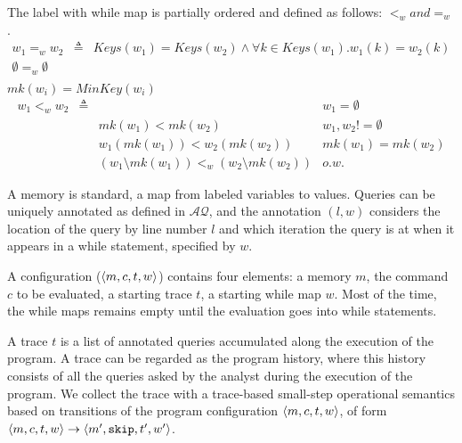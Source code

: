 \documentclass[a4paper,11pt]{article}
\begin{document}
\begin{defn}
The label with while map is partially ordered and defined as follows:
$<_w and =_w$.\\
\[
  \begin{array}{lll}
     w_1 =_w w_2  &  \triangleq &  Keys(w_1) = Keys(w_2) \land \forall k \in Keys(w_1). w_1(k) = w_2(k) \\
     \emptyset =_w \emptyset & &   \\
  \end{array}
\] 
$mk(w_i) =MinKey(w_i) $ 
\[
\begin{array}{llll}
    w_1 <_w w_2 & \triangleq 
     	& & w_1 = \emptyset \\
       	& & mk(w_1) < mk(w_2) & w_1,w_2 != \emptyset  \\
      	& & w_1(mk(w_1)) < w_2(mk(w_2))   & mk(w_1) = mk(w_2) \\
     	& & (w_1 \setminus mk(w_1) ) <_w (w_2 \setminus mk(w_2)) & o.w.
\end{array}
\]
\end{defn}
%

{
A memory is standard, a map from labeled variables to values. 
Queries can be uniquely annotated as defined in $\mathcal{AQ}$, and the annotation $(l,w)$ considers the location of the query by line number $l$ and which iteration the query is at when it appears in a while statement, specified by $w$.
	}

A configuration ($\langle m, c, t,w \rangle$) contains four elements: a memory $m$, the command $c$ to be evaluated, a starting trace $t$, a starting while map $w$. Most of the time, the while maps remains empty until the evaluation goes into while statements.  

A trace $t$ is a list of annotated queries accumulated along the execution of the program. 
A trace can be regarded as the program history, where this history consists of all the queries asked by the analyst during the execution of the program. 
We collect the trace with a trace-based small-step operational semantics based on transitions of the program configuration $\langle m, c, t,w \rangle$,
of form $ \langle m,c, t, w \rangle \to \langle m', \mathtt{skip}, t', w' \rangle $. 
\end{document}
